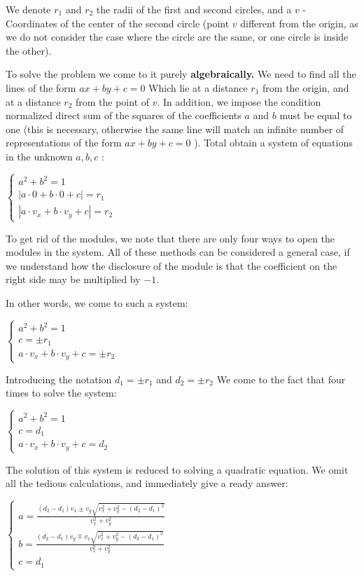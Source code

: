 We denote $r_1$ and $r_2$ the radii of the first and second circles, and a $v$ - Coordinates of the center of the second circle (point $v$ different from the origin, as we do not consider the case where the circle are the same, or one circle is inside the other).

To solve the problem we come to it purely \textbf{algebraically.} We need to find all the lines of the form $ax + by + c = 0$ Which lie at a distance $r_1$ from the origin, and at a distance $r_2$ from the point of $v$. In addition, we impose the condition normalized direct sum of the squares of the coefficients $a$ and $b$ must be equal to one (this is necessary, otherwise the same line will match an infinite number of representations of the form $ax + by + c = 0$ ). Total obtain a system of equations in the unknown $a, b, c$ :

$\begin{cases}
a^{2}+b^{2}=1\\
|a\cdot0+b\cdot0+c|=r_{1}\\
|a\cdot v_{x}+b\cdot v_{y}+c|=r_{2}
\end{cases}$

To get rid of the modules, we note that there are only four ways to open the modules in the system. All of these methods can be considered a general case, if we understand how the disclosure of the module is that the coefficient on the right side may be multiplied by $-1$.

In other words, we come to such a system:

$\begin{cases}
a^{2}+b^{2}=1\\
c=\pm r_{1}\\
a\cdot v_{x}+b\cdot v_{y}+c=\pm r_{2}
\end{cases}$

Introducing the notation $d_1 = \pm r_1$ and $d_2 = \pm r_2$ We come to the fact that four times to solve the system:

$\begin{cases}
a^{2}+b^{2}=1\\
c=d_{1}\\
a\cdot v_{x}+b\cdot v_{y}+c=d_{2}
\end{cases}$

The solution of this system is reduced to solving a quadratic equation. We omit all the tedious calculations, and immediately give a ready answer:

$\begin{cases}
a=\frac{(d_{2}-d_{1})v_{x}\pm v_{y}\sqrt{v_{x}^{2}+v_{y}^{2}-(d_{2}-d_{1})^{2}}}{v_{x}^{2}+v_{y}^{2}}\\
b=\frac{(d_{2}-d_{1})v_{y}\mp v_{x}\sqrt{v_{x}^{2}+v_{y}^{2}-(d_{2}-d_{1})^{2}}}{v_{x}^{2}+v_{y}^{2}}\\
c=d_{1}
\end{cases}$

